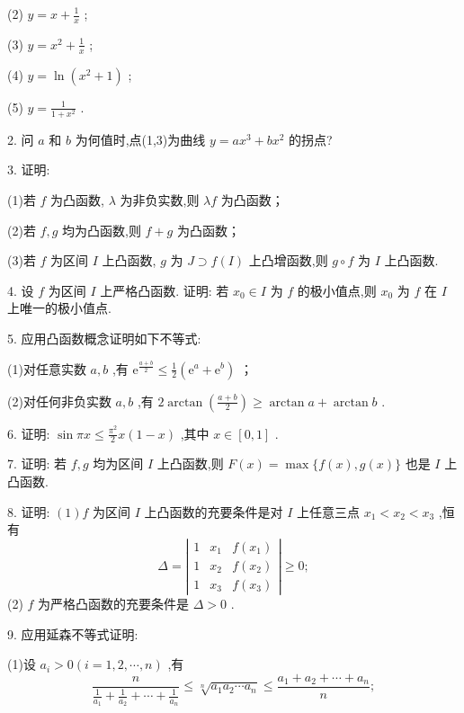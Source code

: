 (2) \(y = x + \frac{1}{x}\) ;

(3) \(y = {x}^{2} + \frac{1}{x}\) ;

(4) \(y = \ln \left( {{x}^{2} + 1}\right)\) ;

(5) \(y = \frac{1}{1 + {x}^{2}}\) .

2. 问 \(a\) 和 \(b\) 为何值时,点(1,3)为曲线 \(y = a{x}^{3} + b{x}^{2}\) 的拐点?

3. 证明:

(1)若 \(f\) 为凸函数, \(\lambda\) 为非负实数,则 \({\lambda f}\) 为凸函数；

(2)若 \(f,g\) 均为凸函数,则 \(f + g\) 为凸函数；

(3)若 \(f\) 为区间 \(I\) 上凸函数, \(g\) 为 \(J \supset  f\left( I\right)\) 上凸增函数,则 \(g \circ  f\) 为 \(I\) 上凸函数.

4. 设 \(f\) 为区间 \(I\) 上严格凸函数. 证明: 若 \({x}_{0} \in  I\) 为 \(f\) 的极小值点,则 \({x}_{0}\) 为 \(f\) 在 \(I\) 上唯一的极小值点.

5. 应用凸函数概念证明如下不等式:

(1)对任意实数 \(a,b\) ,有 \({\mathrm{e}}^{\frac{a + b}{2}} \leq  \frac{1}{2}\left( {{\mathrm{e}}^{a} + {\mathrm{e}}^{b}}\right)\) ；

(2)对任何非负实数 \(a,b\) ,有 \(2\arctan \left( \frac{a + b}{2}\right)  \geq  \arctan a + \arctan b\) .

6. 证明: \(\sin {\pi x} \leq  \frac{{\pi }^{2}}{2}x\left( {1 - x}\right)\) ,其中 \(x \in  \left\lbrack  {0,1}\right\rbrack\) .

7. 证明: 若 \(f,g\) 均为区间 \(I\) 上凸函数,则 \(F\left( x\right)  = \max \{ f\left( x\right) ,g\left( x\right) \}\) 也是 \(I\) 上凸函数.

8. 证明: \(\left( 1\right) f\) 为区间 \(I\) 上凸函数的充要条件是对 \(I\) 上任意三点 \({x}_{1} < {x}_{2} < {x}_{3}\) ,恒有
\[
\Delta  = \left| \begin{array}{lll} 1 & {x}_{1} & f\left( {x}_{1}\right) \\  1 & {x}_{2} & f\left( {x}_{2}\right) \\  1 & {x}_{3} & f\left( {x}_{3}\right)  \end{array}\right|  \geq  0;
\]
(2) \(f\) 为严格凸函数的充要条件是 \(\Delta  > 0\) .

9. 应用延森不等式证明:

(1)设 \({a}_{i} > 0\left( {i = 1,2,\cdots ,n}\right)\) ,有
\[
\frac{n}{\frac{1}{{a}_{1}} + \frac{1}{{a}_{2}} + \cdots  + \frac{1}{{a}_{n}}} \leq  \sqrt[n]{{a}_{1}{a}_{2}\cdots {a}_{n}} \leq  \frac{{a}_{1} + {a}_{2} + \cdots  + {a}_{n}}{n};
\]

